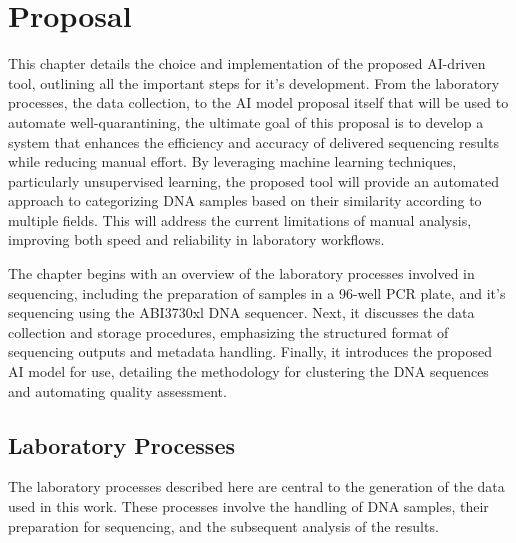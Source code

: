 
%

\makeatletter
\newcommand{\ntifpkgloaded}{%
  \@ifpackageloaded%
}
\makeatother


\chapter{Proposal}
\label{cha:Proposal}


This chapter details the choice and implementation of the proposed AI-driven tool, outlining all the important steps for it's development. From the laboratory processes, the data collection, to the AI model proposal itself that will be used to automate well-quarantining, the ultimate goal of this proposal is to develop a system that enhances the efficiency and accuracy of delivered sequencing results while reducing manual effort. By leveraging machine learning techniques, particularly unsupervised learning, the proposed tool will provide an automated approach to categorizing DNA samples based on their similarity according to multiple fields. This will address the current limitations of manual analysis, improving both speed and reliability in laboratory workflows.

The chapter begins with an overview of the laboratory processes involved in sequencing, including the preparation of samples in a 96-well PCR plate, and it's sequencing using the ABI3730xl DNA sequencer. Next, it discusses the data collection and storage procedures, emphasizing the structured format of sequencing outputs and metadata handling. Finally, it introduces the proposed AI model for use, detailing the methodology for clustering the DNA sequences and automating quality assessment.

\section{Laboratory Processes}
\label{sec:laboratory}

The laboratory processes described here are central to the generation of the data used in this work. These processes involve the handling of DNA samples, their preparation for sequencing, and the subsequent analysis of the results.

